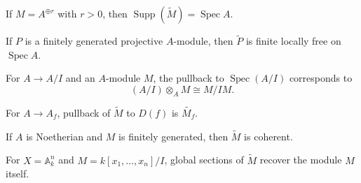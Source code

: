 \begin{example}
If $M=A^{\oplus r}$ with $r>0$, then $\operatorname{Supp}(\widetilde M)=\operatorname{Spec}A$.
\end{example}

\begin{example}
If $P$ is a finitely generated projective $A$-module, then $\widetilde P$ is finite locally free on $\operatorname{Spec}A$.
\end{example}

\begin{example}
For $A\to A/I$ and an $A$-module $M$, the pullback to $\operatorname{Spec}(A/I)$ corresponds to
\[
(A/I)\otimes_A M\cong M/IM.
\]
\end{example}

\begin{example}
For $A\to A_f$, pullback of $\widetilde M$ to $D(f)$ is $\widetilde{M_f}$.
\end{example}

\begin{example}
If $A$ is Noetherian and $M$ is finitely generated, then $\widetilde M$ is coherent.
\end{example}

\begin{example}
For $X=\mathbb A^n_k$ and $M=k[x_1,\ldots,x_n]/I$, global sections of $\widetilde M$ recover the module $M$ itself.
\end{example}
